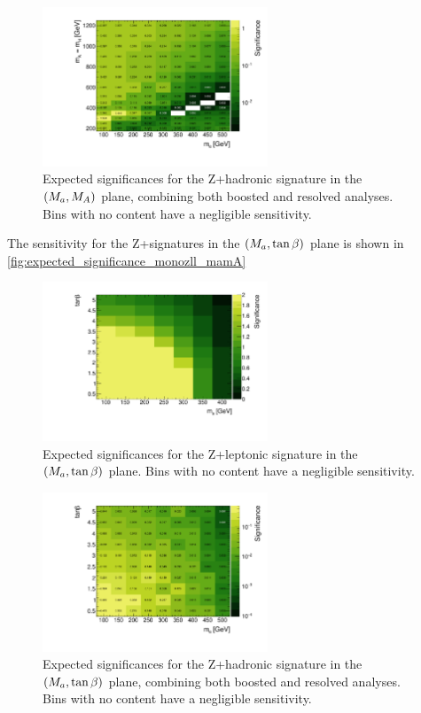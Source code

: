 \begin{figure}
\centering
\includegraphics[width=0.6\textwidth]{texinputs/04_grid/figures/monoz/hadronic/grid_mA_ma_sum_bin100_sign_type3_bkg_uncert_0p10.pdf}
\caption{Expected significances for the Z+\MET hadronic signature in the $(M_{a},M_{A})$ plane, combining both boosted and resolved analyses. Bins with no content have a negligible sensitivity.} 
\label{fig:expected_significance_monozhad_mamA}
\end{figure}

The sensitivity for the Z+\MET signatures in the $(M_{a},\tan\beta)$ plane is shown in \autoref{fig:expected_significance_monozll_mamA} 

\begin{figure}
\centering
\includegraphics[width=0.6\textwidth]{texinputs/04_grid/figures/monoz/leptonic/tanbma_Significance_ll.pdf}
\caption{Expected significances for the Z+\MET leptonic signature in the $(M_{a},\tan\beta)$ plane. Bins with no content have a negligible sensitivity.} 
\label{fig:expected_significance_monozll_mamA}
\end{figure}

\begin{figure}
\centering
\includegraphics[width=0.6\textwidth]{texinputs/04_grid/figures/monoz/hadronic/grid_tanb_ma_sum_bin100_sign_type3_bkg_uncert_0p10.pdf}
\caption{Expected significances for the Z+\MET hadronic signature in the $(M_{a},\tan\beta)$ plane, combining both boosted and resolved analyses. Bins with no content have a negligible sensitivity.} 
\label{fig:expected_significance_monozhad_mamA}
\end{figure}

